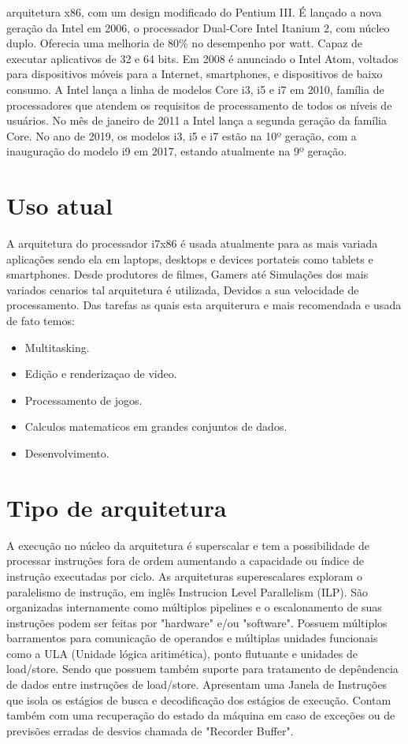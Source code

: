 \documentclass[12pt,a4paper,brazilian,utf8]{ppgsi}
\begin{document}
arquitetura x86, com um design modificado do Pentium III. É lançado a nova geração da Intel em 2006, o processador Dual-Core Intel Itanium 2, com núcleo duplo. Oferecia uma melhoria de 80\% no desempenho por watt. Capaz de executar aplicativos de 32 e 64 bits. Em 2008 é anunciado o Intel Atom, voltados para dispositivos móveis para a Internet, smartphones, e dispositivos de baixo consumo. A Intel lança a linha de modelos Core i3, i5 e i7 em 2010, família de processadores que atendem os requisitos de processamento de todos os níveis de usuários. No mês de janeiro de 2011 a Intel lança a segunda geração da família Core. No ano de 2019, os modelos i3, i5 e i7 estão na 10º geração, com a inauguração do modelo i9 em 2017, estando atualmente na 9º geração.

\section{Uso atual}
    A arquitetura do processador i7x86 é usada atualmente para as mais variada aplicações sendo ela em laptops, desktops e devices portateis como tablets e smartphones. Desde produtores de filmes, Gamers até Simulações dos mais variados cenarios tal arquitetura é utilizada, Devidos a sua velocidade de processamento. Das tarefas as quais esta arquiterura e mais recomendada e usada de fato temos:
     \begin{itemize}
         \item Multitasking.
         \item Edição e renderizaçao de video.
         \item Processamento de jogos.
         \item Calculos matematicos em grandes conjuntos de dados.
         \item Desenvolvimento. 
     \end{itemize}

\section{Tipo de arquitetura}
    A execução no núcleo da arquitetura é superscalar e tem a possibilidade de processar instruções fora de ordem aumentando a capacidade ou índice de instrução executadas por ciclo. As arquiteturas superescalares exploram o paralelismo de instrução, em inglês Instrucion Level Parallelism (ILP). São organizadas internamente como múltiplos pipelines e  o escalonamento de suas instruções podem ser feitas por "hardware" e/ou "software". Possuem múltiplos barramentos para comunicação de operandos e múltiplas unidades funcionais como a ULA (Unidade lógica aritimética), ponto flutuante e unidades de load/store. Sendo que possuem também suporte para tratamento de depêndencia de dados entre instruções de load/store. Apresentam uma Janela de Instruções que isola os estágios de busca e decodificação dos estágios de execução. Contam também com uma recuperação do estado da máquina em caso de exceções ou de previsões erradas de desvios chamada de "Recorder Buffer".
\end{document}
